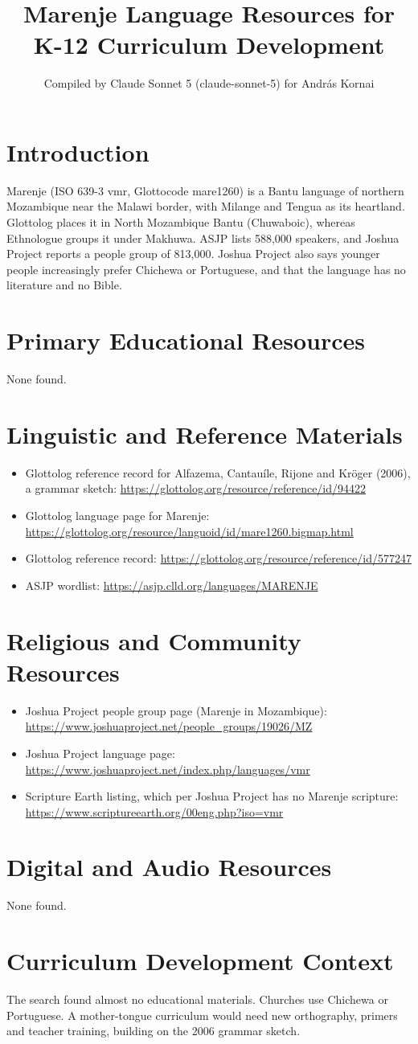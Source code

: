 \documentclass[12pt]{article}
\title{Marenje Language Resources for K-12 Curriculum Development}
\author{Compiled by Claude Sonnet 5 (claude-sonnet-5) for Andr\'as Kornai}
\date{}
\begin{document}
\maketitle
\section{Introduction}
Marenje (ISO 639-3 vmr, Glottocode mare1260) is a Bantu language of northern Mozambique near the Malawi border, with Milange and Tengua as its heartland. Glottolog places it in North Mozambique Bantu (Chuwaboic), whereas Ethnologue groups it under Makhuwa. ASJP lists 588,000 speakers, and Joshua Project reports a people group of 813,000. Joshua Project also says younger people increasingly prefer Chichewa or Portuguese, and that the language has no literature and no Bible.
\section{Primary Educational Resources}
None found.
\section{Linguistic and Reference Materials}
\begin{itemize}
\item Glottolog reference record for Alfazema, Cantau\'ile, Rijone and Kr\"oger (2006), a grammar sketch: \url{https://glottolog.org/resource/reference/id/94422}
\item Glottolog language page for Marenje: \url{https://glottolog.org/resource/languoid/id/mare1260.bigmap.html}
\item Glottolog reference record: \url{https://glottolog.org/resource/reference/id/577247}
\item ASJP wordlist: \url{https://asjp.clld.org/languages/MARENJE}
\end{itemize}
\section{Religious and Community Resources}
\begin{itemize}
\item Joshua Project people group page (Marenje in Mozambique): \url{https://www.joshuaproject.net/people_groups/19026/MZ}
\item Joshua Project language page: \url{https://www.joshuaproject.net/index.php/languages/vmr}
\item Scripture Earth listing, which per Joshua Project has no Marenje scripture: \url{https://www.scriptureearth.org/00eng.php?iso=vmr}
\end{itemize}
\section{Digital and Audio Resources}
None found.
\section{Curriculum Development Context}
The search found almost no educational materials. Churches use Chichewa or Portuguese. A mother-tongue curriculum would need new orthography, primers and teacher training, building on the 2006 grammar sketch.
\end{document}
